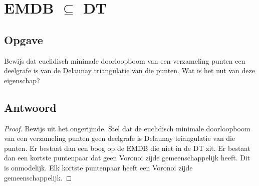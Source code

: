 \documentclass[examenvragen.tex]{subfiles}
\begin{document}
\section{EMDB $\subseteq$ DT}
\subsection{Opgave}
Bewijs dat euclidisch minimale doorloopboom van een verzameling punten een deelgrafe is van de Delaunay triangulatie van die punten. Wat is het nut van deze eigenschap?

\subsection{Antwoord}
\begin{proof}
Bewijs uit het ongerijmde.
Stel dat de euclidisch minimale doorloopboom van een verzameling punten geen deelgrafe is Delaunay triangulatie van die punten. Er bestaat dan een boog op de EMDB die niet in de DT zit. Er bestaat dan een kortste puntenpaar dat geen Voronoi zijde gemeenschappelijk heeft. Dit is onmodelijk. Elk kortste puntenpaar heeft een Voronoi zijde gemeenschappelijk.
\end{proof}
\end{document}
